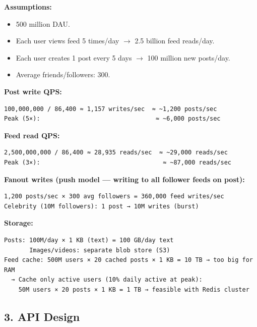 \documentclass[11pt]{article}
\providecommand{\tightlist}{\setlength{\itemsep}{1pt}\setlength{\parskip}{0pt}}
\begin{document}
\textbf{Assumptions:}

\begin{itemize}
\tightlist
\item
  500 million DAU.
\item
  Each user views feed 5 times/day \(\rightarrow\) 2.5 billion feed reads/day.
\item
  Each user creates 1 post every 5 days \(\rightarrow\) 100 million new posts/day.
\item
  Average friends/followers: 300.
\end{itemize}

\textbf{Post write QPS:}

\setcodelang{}

\begin{verbatim}
100,000,000 / 86,400 ≈ 1,157 writes/sec  ≈ ~1,200 posts/sec
Peak (5×):                                ≈ ~6,000 posts/sec
\end{verbatim}

\textbf{Feed read QPS:}

\setcodelang{}

\begin{verbatim}
2,500,000,000 / 86,400 ≈ 28,935 reads/sec  ≈ ~29,000 reads/sec
Peak (3×):                                  ≈ ~87,000 reads/sec
\end{verbatim}

\textbf{Fanout writes (push model --- writing to all follower feeds on post):}

\setcodelang{}

\begin{verbatim}
1,200 posts/sec × 300 avg followers = 360,000 feed writes/sec
Celebrity (10M followers): 1 post → 10M writes (burst)
\end{verbatim}

\textbf{Storage:}

\setcodelang{}

\begin{verbatim}
Posts: 100M/day × 1 KB (text) = 100 GB/day text
       Images/videos: separate blob store (S3)
Feed cache: 500M users × 20 cached posts × 1 KB = 10 TB → too big for RAM
  → Cache only active users (10% daily active at peak):
    50M users × 20 posts × 1 KB = 1 TB → feasible with Redis cluster
\end{verbatim}

\subsection{3. API Design}\label{3-api-design-2}
\end{document}
